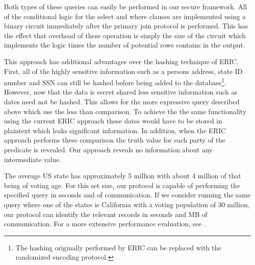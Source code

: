 Both types of these queries can easily be performed in our secure framework. All of the conditional logic for the select and where clauses are implemented using a binary circuit immediately after the primary join protocol is performed. This has the effect that overhead of these operation is simply the size of the circuit which implements the logic times the number of potential rows contains in the output. 

This approach has additional advantages over the hashing technique of ERIC. First, all of the highly sensitive information such as a persons address, state ID number and SSN can still be hashed before being added to the database\footnote{The hashing originally performed by ERIC can be replaced with the randomized encoding protocol.}. However, now that the data is secret shared less sensitive information such as dates need not be hashed. This allows for the more expressive query described above which use the less than comparison. To achieve the the same functionality using the current ERIC approach these dates would have to be stored in plaintext which leaks significant information. In addition, when the ERIC approach performs these comparison the truth value for each party of the predicate is revealed. Our approach reveals no information about any intermediate value. 

The average US state has approximately 5 million with about 4 million of that being of voting age. For this set size, our protocol is capable of performing the specified query in  seconds and  of communication. If we consider running the same query where one of the states is California with a voting population of 30 million, our protocol can identify the relevant records in  seconds and MB of communication. For a more extensive performance evaluation, see .


